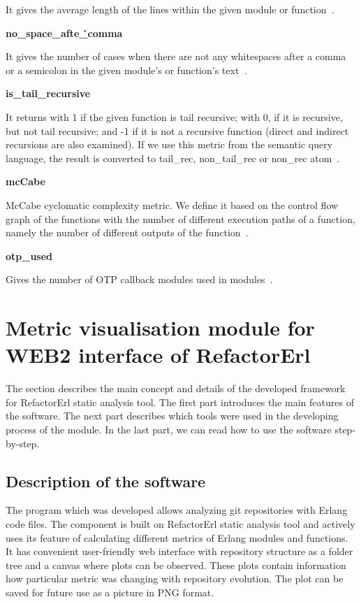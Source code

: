 It gives the average length of the lines within the given module or function~\cite{refactorerlm}.

\textbf{no\_space\_afte\r\_comma}

It gives the number of cases when there are not any whitespaces after a comma or a semicolon in the given module's or function's text~\cite{refactorerlm}.

\textbf{is\_tail\_recursive}

It returns with 1 if the given function is tail recursive; with 0, if it is recursive, but not tail recursive; and -1 if it is not a recursive function (direct and indirect recursions are also examined). If we use this metric from the semantic query language, the result is converted to tail\_rec, non\_tail\_rec or non\_rec atom~\cite{refactorerlm}.

\textbf{mcCabe}

McCabe cyclomatic complexity metric. We define it based on the control flow graph of the functions with the number of different execution paths of a function, namely the number of different outputs of the function~\cite{refactorerlm}.

\textbf{otp\_used}

Gives the number of OTP callback modules used in modules~\cite{refactorerlm}.

\section{Metric visualisation module for WEB2 interface of RefactorErl}

The section describes the main concept and details of the developed framework for RefactorErl static analysis tool. The first part introduces the main features of the software. The next part describes which tools were used in the developing process of the module. In the last part, we can read how to use the software step-by-step.

\subsection{Description of the software}

The program which was developed allows analyzing git repositories with Erlang code files. The component is built on RefactorErl static analysis tool and actively uses its feature of calculating different metrics of Erlang modules and functions. It has convenient user-friendly web interface with repository structure as a folder tree and a canvas where plots can be observed. These plots contain information how particular metric was changing with repository evolution. The plot can be saved for future use as a picture in PNG format.

